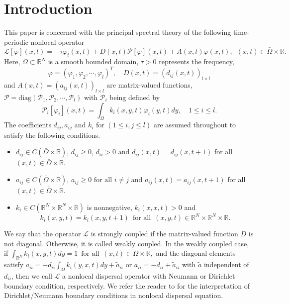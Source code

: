 \documentclass[11pt,reqno]{amsart}
\numberwithin{equation}{section}
\begin{document}
\tableofcontents


\section{ Introduction }
This paper is concerned with the principal spectral theory of the following time-periodic nonlocal operator 
\begin{equation*}
\mathcal{L}[\varphi](x,t) = -\tau\varphi_{t}(x,t)+D(x,t)\mathcal{P}[\varphi](x,t)+ A(x,t)\varphi(x,t), \enspace (x,t)\in\bar{\Omega}\times\mathbb{R}.
\end{equation*}
Here, $\Omega \subset \mathbb{R}^{N}$ is a smooth bounded domain, 
$\tau>0$ represents the frequency,
$$\varphi = (\varphi_1, \varphi_2, \cdots, \varphi_l)^{T}, \quad D(x,t) = (d_{ij}(x,t))_{l \times l}$$
and $A(x,t) = (a_{ij}(x,t))_{l \times l}$ are matrix-valued functions,
$\mathcal{P} = \text{diag} (\mathcal{P}_{1}, \mathcal{P}_{2},\cdots,\mathcal{P}_{l}  )$ with $\mathcal{P}_{i}$ being defined by
\begin{equation*}
\mathcal{P}_{i}[\varphi_{i}](x,t) = \int_{\Omega} k_{i}(x,y,t)\varphi_{i}(y,t)dy, \quad 1\leq i \leq l.
\end{equation*} 
The coefficients $d_{ij},a_{ij}$ and $k_{i}$ for $(1\leq i,j\leq l)$ are assumed throughout to satisfy the following conditions.
\begin{itemize}[leftmargin= 0.9cm]
\item[(H1)] $d_{ij}\in C(\bar{\Omega} \times \mathbb{R})$, $d_{ij}\geq 0$, $d_{ii}>0$ and $d_{ij}(x,t) = d_{ij}(x,t+1)$ for all $(x,t) \in \bar{\Omega}\times \mathbb{R}$.


\item[(H2)] $a_{ij}\in C(\bar{\Omega} \times \mathbb{R})$,   $a_{ij} \geq 0 \text{ for all } i\neq j$
and $a_{ij}(x,t) = a_{ij}(x,t+1)$ for all $(x,t) \in \bar{\Omega}\times \mathbb{R}$.


\item[(H3)] $k_{i}\in C\left(\mathbb{R}^{N} \!\times\! \mathbb{R}^{N}\! \times\! \mathbb{R}\right)$ is nonnegative,
$k_{i}(x,x,t)>0$ and
$$k_{i}(x,y,t) = k_{i}(x,y,t+1)
\enspace \text{for all} \enspace
(x,y,t) \in \mathbb{R}^{N} \! \times \! \mathbb{R}^{N} \!\times\! \mathbb{R}.$$
\end{itemize}

We say that the operator $\mathcal{L}$ is strongly coupled if the matrix-valued function $D$ is not diagonal. Otherwise, it is called weakly coupled.
In the weakly coupled case, if
$
\int_{\mathbb{R}^{N}} k_{i}(x,y,t)dy = 1
\enspace \text{for all} \enspace
(x,t)\in\bar{\Omega}\times \mathbb{R},
$
and the diagonal elements satisfy $a_{ii} = - d_{ii}\int_{\Omega}k_{i}(y,x,t)dy + \tilde{a}_{ii}$ or $a_{ii} = -d_{ii} + \tilde{a}_{ii}$ with $\tilde{a}$ independent of $d_{ii}$, then we call $\mathcal{L}$ a nonlocal dispersal operator with Neumann or Dirichlet boundary condition, respectively.
We refer the reader to \cite{AMRM} for the interpretation of Dirichlet/Neumann boundary conditions in nonlocal dispersal equation.
%
%
%
\end{document}
